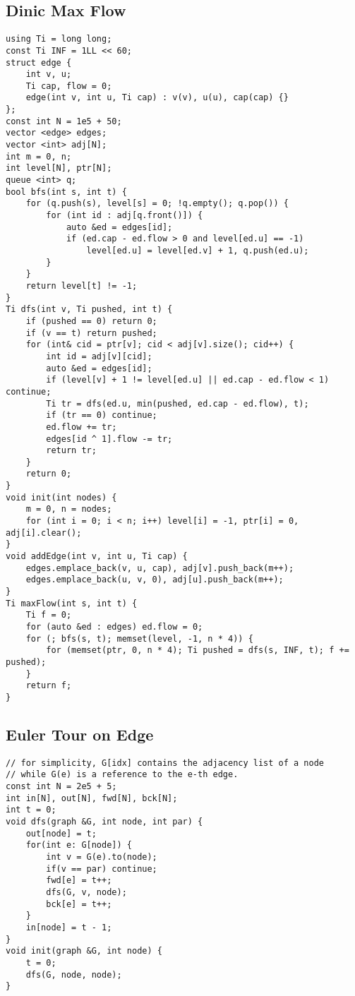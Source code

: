 \documentclass[FSZ,a4paper,onesided]{article}
\begin{document}
\begin{multicols*}{\COLS}
\subsection{Dinic Max Flow}
\begin{lstlisting}
using Ti = long long;
const Ti INF = 1LL << 60;
struct edge {
    int v, u;
    Ti cap, flow = 0;
    edge(int v, int u, Ti cap) : v(v), u(u), cap(cap) {}
};
const int N = 1e5 + 50;
vector <edge> edges;
vector <int> adj[N];
int m = 0, n;
int level[N], ptr[N];
queue <int> q;
bool bfs(int s, int t) {
    for (q.push(s), level[s] = 0; !q.empty(); q.pop()) {
        for (int id : adj[q.front()]) {
            auto &ed = edges[id];
            if (ed.cap - ed.flow > 0 and level[ed.u] == -1)
                level[ed.u] = level[ed.v] + 1, q.push(ed.u);
        }
    }
    return level[t] != -1;
}
Ti dfs(int v, Ti pushed, int t) {
    if (pushed == 0) return 0;
    if (v == t) return pushed;
    for (int& cid = ptr[v]; cid < adj[v].size(); cid++) {
        int id = adj[v][cid];
        auto &ed = edges[id];
        if (level[v] + 1 != level[ed.u] || ed.cap - ed.flow < 1) continue;
        Ti tr = dfs(ed.u, min(pushed, ed.cap - ed.flow), t);
        if (tr == 0) continue;
        ed.flow += tr;
        edges[id ^ 1].flow -= tr;
        return tr;
    }
    return 0;
}
void init(int nodes) {
    m = 0, n = nodes;
    for (int i = 0; i < n; i++) level[i] = -1, ptr[i] = 0, adj[i].clear();
}
void addEdge(int v, int u, Ti cap) {
    edges.emplace_back(v, u, cap), adj[v].push_back(m++);
    edges.emplace_back(u, v, 0), adj[u].push_back(m++);
}
Ti maxFlow(int s, int t) {
    Ti f = 0;
    for (auto &ed : edges) ed.flow = 0;
    for (; bfs(s, t); memset(level, -1, n * 4)) {
        for (memset(ptr, 0, n * 4); Ti pushed = dfs(s, INF, t); f += pushed);
    }
    return f;
}
\end{lstlisting}
\subsection{Euler Tour on Edge}
\begin{lstlisting}
// for simplicity, G[idx] contains the adjacency list of a node
// while G(e) is a reference to the e-th edge.
const int N = 2e5 + 5;
int in[N], out[N], fwd[N], bck[N];
int t = 0;
void dfs(graph &G, int node, int par) {
    out[node] = t; 
    for(int e: G[node]) {
        int v = G(e).to(node);
        if(v == par) continue;
        fwd[e] = t++;
        dfs(G, v, node);
        bck[e] = t++;
    }
    in[node] = t - 1;
}
void init(graph &G, int node) {
    t = 0;
    dfs(G, node, node);
}
\end{lstlisting}

\end{multicols*}
\end{document}
